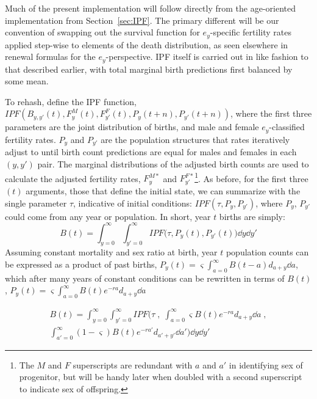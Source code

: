 
Much of the present implementation will follow directly from the age-oriented
implementation from Section~\ref{sec:IPF}. The primary different will be our
convention of swapping out the survival function for $e_y$-specific fertility
rates applied step-wise to elements of the death distribution, as seen elsewhere
in renewal formulas for the $e_y$-perspective. IPF itself is carried out in like
fashion to that described earlier, with total marginal birth predictions
first balanced by some mean. 

To rehash, define the IPF function,
$IPF(B_{y,y'}(t), F_y^M(t), F_{y'}^F(t),P_y(t+n),P_{y'}(t+n))$, where the first
three parameters are the joint distribution of births, and male and female
$e_y$-classified fertility rates. $P_y$ and $P_{y'}$ are the population
structures that rates iteratively adjust to until birth count predictions are
equal for males and females in each $(y,y')$ pair. The marginal distributions of
the adjusted birth counts are used to calculate the adjusted fertility rates,
$F_y^{M\ast}$ and $F_{y'}^{F\ast}$\footnote{The $M$ and $F$ superscripts are
redundant with $a$ and $a'$ in identifying sex of progenitor, but will be handy
later when doubled with a second superscript to indicate sex of offspring.}. As
before, for the first three $(t)$ arguments, those that define the initial
state, we can summarize with the single parameter $\tau$, indicative of initial
conditions: $IPF(\tau,P_y, P_{y'})$, where $P_y$, $P_{y'}$ could come from any
year or population. In short, year $t$ births are simply:
\begin{equation}
B(t) = \int _{y=0}^\infty \int _{y'=0}^\infty IPF\Big(\tau,P_y(t),
P_{y'}(t)\Big) \dd y \dd y'
\end{equation}
Assuming constant mortality and sex ratio at birth, year $t$ population counts
can be expressed as a product of past births, $P_y(t) =
\varsigma \int_{a=0}^\infty B(t-a)d_{a+y} \dd a$, which after many years of
constant conditions can be rewritten in terms of $B(t)$, $P_y(t) =
\varsigma \int_{a=0}^\infty B(t)e^{-ra}d_{a+y} \dd a$

\begin{equation}
\label{eq:ex2sexIPFunity3}
\begin{split}
B(t) = \int _{y=0}^\infty \int _{y'=0}^\infty IPF\Bigg(\tau\;,\;
 \int_{a=0}^\infty \varsigma B(t) e^{-ra}d_{a+y} \dd a\;, \\ 
 \int_{a'=0}^\infty (1-\varsigma) B(t)e^{-ra'}d_{a'+y'} \dd a'\Bigg) \dd y \dd
 y'
\end{split}
\end{equation}

